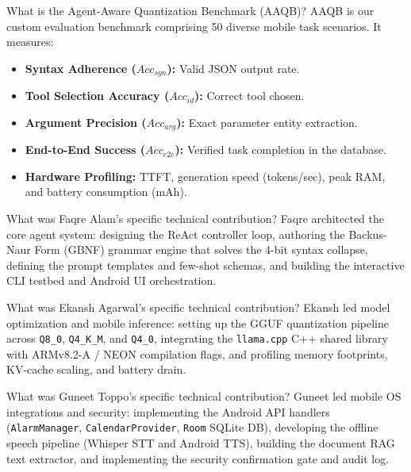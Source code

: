 \documentclass[11pt,a4paper]{article}
\begin{document}
\begin{qabox}{What is the Agent-Aware Quantization Benchmark (AAQB)?}
AAQB is our custom evaluation benchmark comprising 50 diverse mobile task scenarios. It measures:
\begin{itemize}[leftmargin=*]
  \item \textbf{Syntax Adherence ($Acc_{syn}$):} Valid JSON output rate.
  \item \textbf{Tool Selection Accuracy ($Acc_{id}$):} Correct tool chosen.
  \item \textbf{Argument Precision ($Acc_{arg}$):} Exact parameter entity extraction.
  \item \textbf{End-to-End Success ($Acc_{e2e}$):} Verified task completion in the database.
  \item \textbf{Hardware Profiling:} TTFT, generation speed (tokens/sec), peak RAM, and battery consumption (mAh).
\end{itemize}
\end{qabox}

\begin{qabox}{What was Faqre Alam's specific technical contribution?}
Faqre architected the core agent system: designing the ReAct controller loop, authoring the Backus-Naur Form (GBNF) grammar engine that solves the 4-bit syntax collapse, defining the prompt templates and few-shot schemas, and building the interactive CLI testbed and Android UI orchestration.
\end{qabox}

\begin{qabox}{What was Ekansh Agarwal's specific technical contribution?}
Ekansh led model optimization and mobile inference: setting up the GGUF quantization pipeline across \texttt{Q8\_0}, \texttt{Q4\_K\_M}, and \texttt{Q4\_0}, integrating the \texttt{llama.cpp} C++ shared library with ARMv8.2-A / NEON compilation flags, and profiling memory footprints, KV-cache scaling, and battery drain.
\end{qabox}

\begin{qabox}{What was Guneet Toppo's specific technical contribution?}
Guneet led mobile OS integrations and security: implementing the Android API handlers (\texttt{AlarmManager}, \texttt{CalendarProvider}, \texttt{Room} SQLite DB), developing the offline speech pipeline (Whisper STT and Android TTS), building the document RAG text extractor, and implementing the security confirmation gate and audit log.
\end{qabox}
\end{document}
